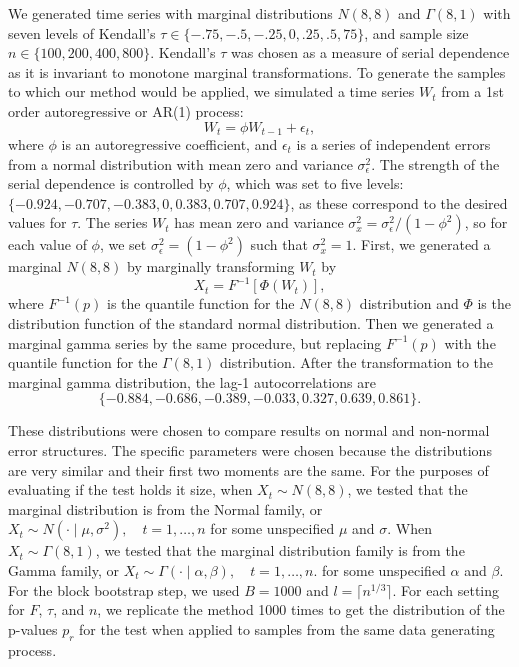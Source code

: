 \documentclass[APA,Times1COL]{WileyNJDv5} %
\begin{document}
We generated time series with marginal distributions $N(8, 8)$ and
$\Gamma(8, 1)$ with seven levels of Kendall's
$\tau \in \{-.75, -.5, -.25, 0, .25, .5, 75\}$, and
sample size $n \in \{100, 200, 400, 800\}$. Kendall's $\tau$ was chosen as a
measure of serial dependence as it is invariant to monotone marginal
transformations. To generate the samples to which our
method would be applied, we simulated a time series $W_t$ from a 1st 
order autoregressive or AR(1) process:
\begin{equation*}
W_t = \phi W_{t-1} + \epsilon_t,
\end{equation*}
where $\phi$ is an autoregressive coefficient, and $\epsilon_t$ is a series of
independent errors from a normal distribution with mean zero and variance
$\sigma_{\epsilon}^2$. The strength of the serial dependence is controlled by
$\phi$, which was set to five levels: 
$\{-0.924, -0.707, -0.383, 0, 0.383, 0.707, 0.924\}$, as these
correspond to the desired values for $\tau$. The 
series $W_t$ has mean zero and variance 
$\sigma_x^2 = \sigma_{\epsilon}^2 / (1 - \phi^2)$, so for each value of
$\phi$,  we 
set $\sigma_{\epsilon}^2 = (1 - \phi^2)$ such that $\sigma_x^2 = 1$.
First, we generated a
marginal $N(8, 8)$ by marginally transforming $W_t$ by
\begin{equation*}
X_t = F^{-1}[\Phi(W_t)],
\end{equation*}
where $F^{-1}(p)$ is the quantile function for the $N(8, 8)$ 
distribution and $\Phi$ is the distribution function of the standard normal
distribution.
Then we generated a marginal gamma series by the same procedure, but
replacing $F^{-1}(p)$ with the quantile function for the $\Gamma(8, 1)$
distribution.
After the transformation
to the marginal gamma distribution, the lag-1 autocorrelations are
\[
  \{-0.884, -0.686, -0.389, -0.033, 0.327, 0.639, 0.861\}.
\]


These distributions
were chosen to compare results on normal and non-normal
error structures. The specific parameters were chosen because the distributions 
are very similar and their
first two moments are the same. 
For the purposes of 
evaluating if the test holds it size, when $X_t \sim N(8, 8)$, we tested that the 
marginal distribution is from the
Normal family, or 
$X_t \sim N(\cdot \mid \mu, \sigma^2), \quad t = 1, \ldots, n$
for some unspecified $\mu$ and $\sigma$. When $X_t \sim \Gamma(8, 1)$, we tested
that the marginal distribution family is from the Gamma family,
or
$X_t \sim \Gamma(\cdot \mid \alpha, \beta), \quad t = 1, \ldots, n$.
for some unspecified $\alpha$ and $\beta$.
For the block
bootstrap step,
we used $B = 1000$ and $l = \lceil n^{1/3} \rceil$.
For each setting for $F$, $\tau$, and $n$, we replicate the method 1000 times 
to get the distribution of the p-values $p_r$
for the test when applied to samples from the same data generating process.
\end{document}
